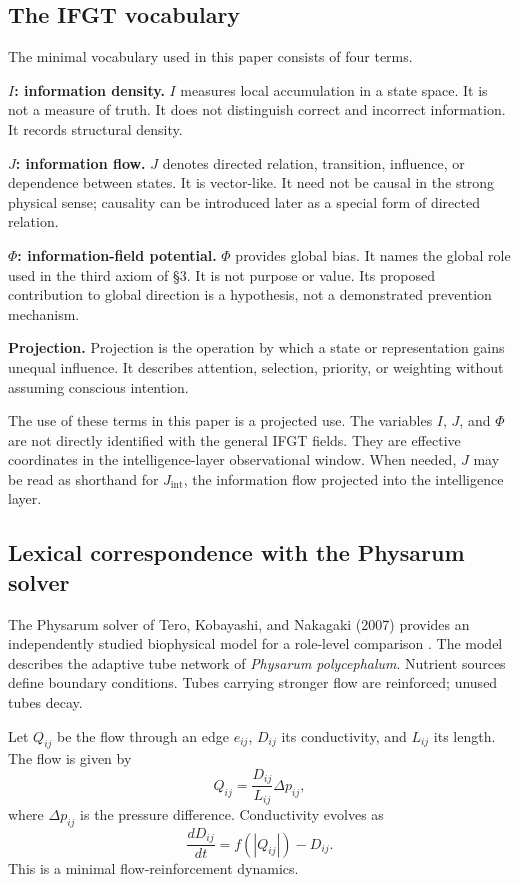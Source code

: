 \subsection{The IFGT vocabulary}

The minimal vocabulary used in this paper consists of four terms.

\textbf{$I$: information density.}
\(I\) measures local accumulation in a state space. It is not a measure of truth. It does not distinguish correct and incorrect information. It records structural density.

\textbf{$J$: information flow.}
\(J\) denotes directed relation, transition, influence, or dependence between states. It is vector-like. It need not be causal in the strong physical sense; causality can be introduced later as a special form of directed relation.

\textbf{$\Phi$: information-field potential.}
\(\Phi\) provides global bias. It names the global role used in the third axiom of \S{}3. It is not purpose or value. Its proposed contribution to global direction is a hypothesis, not a demonstrated prevention mechanism.

\textbf{Projection.}
Projection is the operation by which a state or representation gains unequal influence. It describes attention, selection, priority, or weighting without assuming conscious intention.

The use of these terms in this paper is a projected use. The variables $I$, $J$, and $\Phi$ are not directly identified with the general IFGT fields. They are effective coordinates in the intelligence-layer observational window. When needed, $J$ may be read as shorthand for $J_{\mathrm{int}}$, the information flow projected into the intelligence layer.

\subsection{Lexical correspondence with the Physarum solver}

The Physarum solver of Tero, Kobayashi, and Nakagaki (2007) provides an independently studied biophysical model for a role-level comparison \citep{Tero2007}. The model describes the adaptive tube network of \emph{Physarum polycephalum}. Nutrient sources define boundary conditions. Tubes carrying stronger flow are reinforced; unused tubes decay.

Let \(Q_{ij}\) be the flow through an edge \(e_{ij}\), \(D_{ij}\) its conductivity, and \(L_{ij}\) its length. The flow is given by
\[
Q_{ij}=\frac{D_{ij}}{L_{ij}}\Delta p_{ij},
\]
where \(\Delta p_{ij}\) is the pressure difference. Conductivity evolves as
\[
\frac{dD_{ij}}{dt}=f(|Q_{ij}|)-D_{ij}.
\]
This is a minimal flow-reinforcement dynamics.

